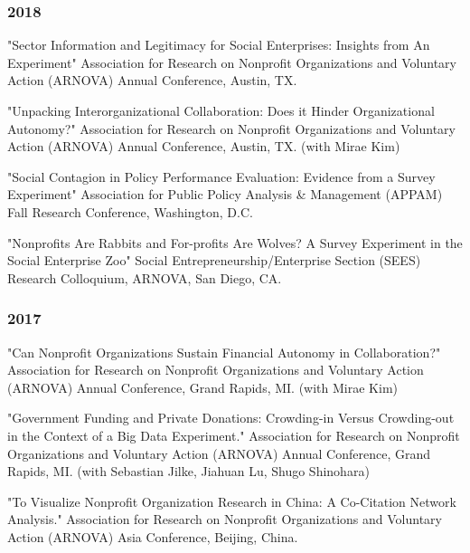 \documentclass[letterpaper]{article}
\renewenvironment{itemize}{
  \begin{list}{}{
    \setlength{\leftmargin}{1.5em}
  }
}{
  \end{list}
}
\begin{document}
\subsubsection*{2018}
\begin{itemize}

\item "Sector Information and Legitimacy for Social Enterprises: Insights from An Experiment" Association for Research on Nonprofit Organizations and Voluntary Action (ARNOVA) Annual Conference, Austin, TX. 

\item "Unpacking Interorganizational Collaboration: Does it Hinder Organizational Autonomy?" Association for Research on Nonprofit Organizations and Voluntary Action (ARNOVA) Annual Conference, Austin, TX. (with Mirae Kim) 

\item "Social Contagion in Policy Performance Evaluation: Evidence from a Survey Experiment" Association for Public Policy Analysis \& Management (APPAM) Fall Research Conference, Washington, D.C. 

\item "Nonprofits Are Rabbits and For-profits Are Wolves? A Survey Experiment in the Social Enterprise Zoo" Social Entrepreneurship/Enterprise Section (SEES) Research Colloquium, ARNOVA, San Diego, CA.

\end{itemize}

\subsubsection*{2017}
\begin{itemize}
\item "Can Nonprofit Organizations Sustain Financial Autonomy in Collaboration?" Association for Research on Nonprofit Organizations and Voluntary Action (ARNOVA) Annual Conference, Grand Rapids, MI. (with Mirae Kim)

\item "Government Funding and Private Donations: Crowding-in Versus Crowding-out in the Context of a Big Data Experiment." Association for Research on Nonprofit Organizations and Voluntary Action (ARNOVA) Annual Conference, Grand Rapids, MI. (with Sebastian Jilke, Jiahuan Lu, Shugo Shinohara)

\item "To Visualize Nonprofit Organization Research in China: A Co-Citation Network Analysis." Association for Research on Nonprofit Organizations and Voluntary Action (ARNOVA) Asia Conference, Beijing, China.

\end{itemize}
\end{document}

